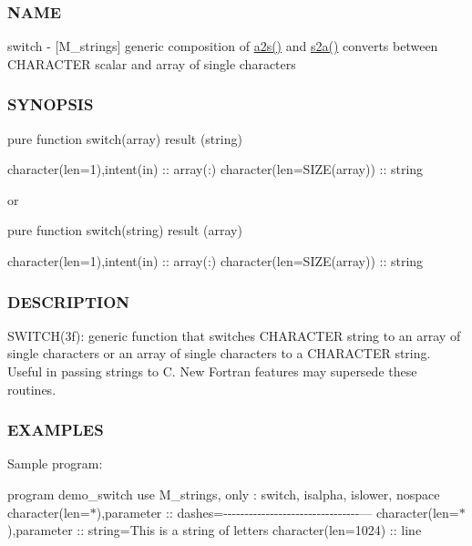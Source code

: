 \subsubsection*{N\+A\+ME}

switch -\/ \mbox{[}M\+\_\+strings\mbox{]} generic composition of \hyperlink{namespacem__strings_a9365ae5277199446d93fc5208be2e9a5}{a2s()} and \hyperlink{namespacem__strings_a5b05f337c8851871a4fb0b3cf56663cd}{s2a()} converts between C\+H\+A\+R\+A\+C\+T\+ER scalar and array of single characters

\subsubsection*{S\+Y\+N\+O\+P\+S\+IS}

\begin{DoxyVerb}pure function switch(array) result (string)

 character(len=1),intent(in) :: array(:)
 character(len=SIZE(array))  :: string

or

pure function switch(string) result (array)

 character(len=1),intent(in) :: array(:)
 character(len=SIZE(array))  :: string
\end{DoxyVerb}


\subsubsection*{D\+E\+S\+C\+R\+I\+P\+T\+I\+ON}

\begin{DoxyVerb}SWITCH(3f): generic function that switches CHARACTER string to an array
of single characters or an array of single characters to a CHARACTER
string. Useful in passing strings to C.  New Fortran features may
supersede these routines.
\end{DoxyVerb}


\subsubsection*{E\+X\+A\+M\+P\+L\+ES}

Sample program\+:

program demo\+\_\+switch use M\+\_\+strings, only \+: switch, isalpha, islower, nospace character(len=$\ast$),parameter \+:\+: dashes=\textquotesingle{}-\/-\/-\/-\/-\/-\/-\/-\/-\/-\/-\/-\/-\/-\/-\/-\/-\/-\/-\/-\/-\/-\/-\/-\/-\/-\/-\/-\/-\/-\/-\/-\/---\textquotesingle{} character(len=$\ast$),parameter \+:\+: string=\textquotesingle{}This is a string of letters\textquotesingle{} character(len=1024) \+:\+: line

